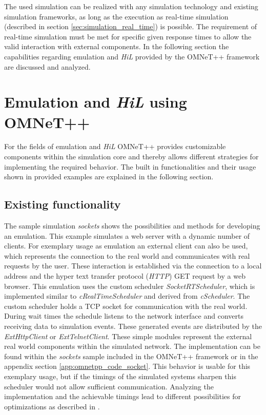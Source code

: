 The used simulation can be realized with any simulation technology and existing simulation frameworks, as long as the execution as real-time simulation (described in section \ref{sec:simulation_real_time}) is possible.
The requirement of real-time simulation must be met for specific given response times to allow the valid interaction with external components.
In the following section the capabilities regarding emulation and \emph{HiL} provided by the OMNeT++ framework are discussed and analyzed.

\section{Emulation and \emph{HiL} using OMNeT++}
\label{sec:emulation_omnet}
For the fields of emulation and \emph{HiL} OMNeT++ provides customizable components within the simulation core and thereby allows different strategies for implementing the required behavior.
The built in functionalities and their usage shown in provided examples are explained in the following section.

\subsection{Existing functionality}
\label{sec:emulation_omnet_existing}

The sample simulation \emph{sockets} shows the possibilities and methods for developing an emulation.
This example simulates a web server with a dynamic number of clients.
For exemplary usage as emulation an external client can also be used, which represents the connection to the real world and communicates with real requests by the user.
These interaction is established via the connection to a local address and the hyper text transfer protocol (\emph{HTTP}) GET request by a web browser.
This emulation uses the custom scheduler \emph{SocketRTScheduler}, which is implemented similar to \emph{cRealTimeScheduler} and derived from \emph{cScheduler}. \cite{omnet_api}
The custom scheduler holds a TCP socket for communication with the real world.
During wait times the schedule listens to the network interface and converts receiving data to simulation events.
These generated events are distributed by the \emph{ExtHttpClient} or \emph{ExtTelnetClient}.
These simple modules represent the external real world components within the simulated network.
The implementation can be found within the \emph{sockets} sample included in the OMNeT++ framework or in the appendix section \ref{app:omnetpp_code_socket}.
This behavior is usable for this exemplary usage, but if the timings of the simulated systems sharpen this scheduler would not allow sufficient communication.
Analyzing the implementation and the achievable timings lead to different possibilities for optimizations as described in \cite{scussel_improvements_2015}.

